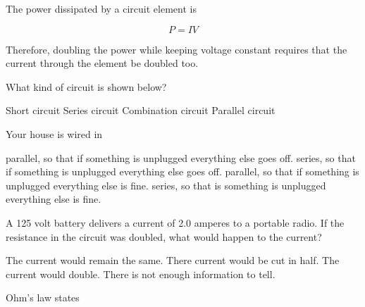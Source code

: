 \documentclass[]{exam}
\begin{document}
\begin{questions}
\begin{solution}
The power dissipated by a circuit element is

\begin{equation*}
    P=IV
\end{equation*}

Therefore, doubling the power while keeping voltage constant requires that the current through the element be doubled too.
\end{solution}

\question
What kind of circuit is shown below?

\begin{center}
\end{center}

\begin{randomizeoneparchoices}
    \choice Short circuit
    \choice Series circuit
    \correctchoice Combination circuit
    \choice Parallel circuit
\end{randomizeoneparchoices}

\question
Your house is wired in

\begin{randomizechoices}
    \choice parallel, so that if something is unplugged everything else goes off.
    \choice series, so that if something is unplugged everything else goes off.
    \correctchoice parallel, so that if something is unplugged everything else is fine.
    \choice series, so that is something is unplugged everything else is fine.
\end{randomizechoices}

\question
A 125 volt battery delivers a current of 2.0 amperes to a portable radio. If the resistance in the circuit was doubled, what would happen to the current?

\begin{randomizechoices}[keeplast]
    \choice The current would remain the same.
    \correctchoice There current would be cut in half.
    \choice The current would double.
    \choice There is not enough information to tell.
\end{randomizechoices}

\begin{solution}
Ohm's law states


\end{solution}
\end{questions}
\end{document}
